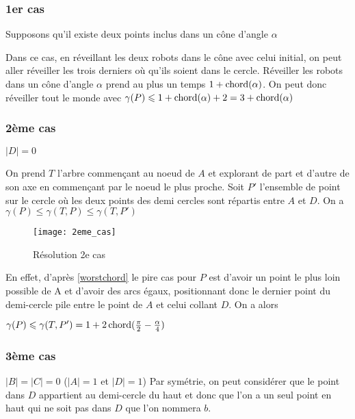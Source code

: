 \subsubsection*{1er cas}\label{1cas} Supposons qu'il existe deux points inclus dans un cône d'angle $\alpha$

Dans ce cas, en réveillant les deux robots dans le cône avec celui initial, on peut aller réveiller les trois derniers où qu'ils soient dans le cercle. Réveiller les robots dans un cône d'angle $\alpha$ prend au plus un temps $1 + \operatorname{chord}(\alpha)$.
On peut donc réveiller tout le monde avec $\gamma(P) \leqslant 1 + \operatorname{chord}(\alpha) + 2 = 3 + \operatorname{chord}(\alpha)$

\subsubsection*{2ème cas}\label{2cas} $|D| = 0$

On prend $T$ l'arbre commençant au noeud de $A$ et explorant de part et d'autre de son axe en commençant par le noeud le plus proche.
Soit $P'$ l'ensemble de point sur le cercle où les deux points des demi cercles sont répartis entre $A$ et $D$.
On a $\gamma(P) \leq  \gamma(T, P) \leq \gamma(T, P')$

\begin{figure}[h!]
  \centering
  \texttt{[image: 2eme\_cas]}
  \caption{Résolution 2e cas}
  \label{fig:2eme_cas}
\end{figure}

En effet, d'après \ref{worstchord} le pire cas pour $P$ est d'avoir un point le plus loin possible de A et d'avoir des arcs égaux, positionnant donc le dernier point du demi-cercle pile entre le point de $A$ et celui collant $D$. On a alors

$\gamma(P) \leqslant \gamma(T, P') = 1 + 2\operatorname{chord}(\frac{\pi}{2} - \frac{\alpha}{4})$

\subsubsection*{3ème cas}\label{3cas} $|B| = |C| = 0$ ($|A| = 1$ et $|D| = 1$)
Par symétrie, on peut considérer que le point dans $D$ appartient au demi-cercle du haut et donc que l'on a un seul point en haut qui ne soit pas dans $D$ que l'on nommera $b$.

